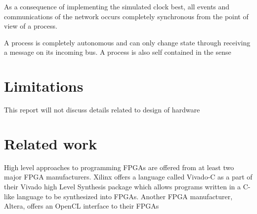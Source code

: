 \begin{property}
  \label{synchro}
  As a consequence of implementing the simulated clock best, all
  events and communications of the network occurs completely
  synchronous from the point of view of a process.
\end{property}

\begin{property}
  \label{noshare}
  A process is completely autonomous and can only change state through
  receiving a message on its incoming bus. A process is also self
  contained in the sense
\end{property}



\section{Limitations}
This report will not discuss details related to design of hardware

\section{Related work}

High level approaches to programming FPGAs are offered from at least
two major FPGA manufacturers. Xilinx offers a language called Vivado-C
as a part of their Vivado high Level Synthesis package which allows
programs written in a C-like language to be synthesized into
FPGAs. Another FPGA manufacturer, Altera, offers an OpenCL interface
to their FPGAs



